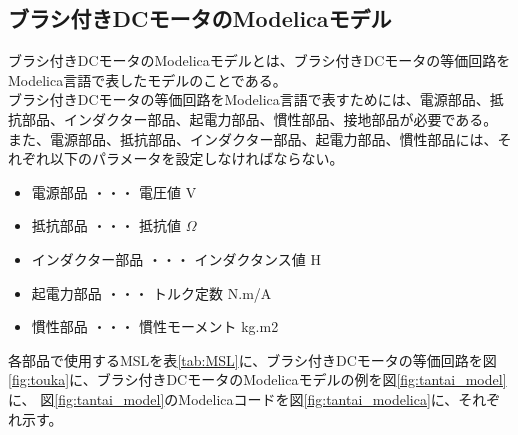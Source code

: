 \subsection{ブラシ付きDCモータのModelicaモデル}\label{sub:tanntai}
ブラシ付きDCモータのModelicaモデルとは、ブラシ付きDCモータの等価回路\cite{等価回路}をModelica言語で表したモデルのことである。\\
ブラシ付きDCモータの等価回路をModelica言語で表すためには、電源部品、抵抗部品、インダクター部品、起電力部品、慣性部品、接地部品が必要である。\\
また、電源部品、抵抗部品、インダクター部品、起電力部品、慣性部品には、それぞれ以下のパラメータを設定しなければならない。
\begin{itemize}
	\item 電源部品 ・・・ 電圧値 V
	\item 抵抗部品 ・・・ 抵抗値 $\Omega$
	\item インダクター部品 ・・・ インダクタンス値 H
	\item 起電力部品 ・・・ トルク定数 N.m/A
	\item 慣性部品 ・・・ 慣性モーメント kg.m2
\end{itemize}
各部品で使用するMSLを表\ref{tab:MSL}に、ブラシ付きDCモータの等価回路を図\ref{fig:touka}に、ブラシ付きDCモータのModelicaモデルの例を図\ref{fig:tantai_model}に、
図\ref{fig:tantai_model}のModelicaコードを図\ref{fig:tantai_modelica}に、それぞれ示す。

